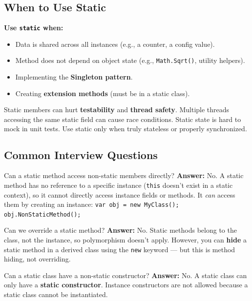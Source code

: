 \documentclass[11pt,a4paper]{article}
\begin{document}
\subsection{When to Use Static}

\textbf{Use \texttt{static} when:}
\begin{itemize}[leftmargin=*]
    \item Data is shared across all instances (e.g., a counter, a config value).
    \item Method does not depend on object state (e.g., \texttt{Math.Sqrt()}, utility helpers).
    \item Implementing the \textbf{Singleton pattern}.
    \item Creating \textbf{extension methods} (must be in a static class).
\end{itemize}

\begin{gotchaBox}
Static members can hurt \textbf{testability} and \textbf{thread safety}. Multiple threads accessing the same static field can cause race conditions. Static state is hard to mock in unit tests. Use static only when truly stateless or properly synchronized.
\end{gotchaBox}

\subsection{Common Interview Questions}

\begin{intqBox}{Can a static method access non-static members directly?}
\textbf{Answer:} No. A static method has no reference to a specific instance (\texttt{this} doesn't exist in a static context), so it cannot directly access instance fields or methods. It \textit{can} access them by creating an instance: \texttt{var obj = new MyClass(); obj.NonStaticMethod();}
\end{intqBox}

\begin{intqBox}{Can we override a static method?}
\textbf{Answer:} No. Static methods belong to the class, not the instance, so polymorphism doesn't apply. However, you can \textbf{hide} a static method in a derived class using the \texttt{new} keyword — but this is method hiding, not overriding.
\end{intqBox}

\begin{intqBox}{Can a static class have a non-static constructor?}
\textbf{Answer:} No. A static class can only have a \textbf{static constructor}. Instance constructors are not allowed because a static class cannot be instantiated.
\end{intqBox}
\end{document}
